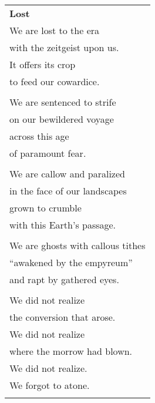 \documentclass{article}
\begin{document}
\begin{center}
\begin{tabular}{l}
\textbf{Lost}
\\
We are lost to the era \\
with the zeitgeist upon us. \\
It offers its crop \\
to feed our cowardice. \\
\\
We are sentenced to strife \\
on our bewildered voyage \\
across this age \\
of paramount fear. \\
\\
We are callow and paralized \\
in the face of our landscapes \\
grown to crumble \\
with this Earth's passage. \\
\\
We are ghosts with callous tithes \\
``awakened by the empyreum'' \\
and rapt by gathered eyes. \\
\\
We did not realize \\
the conversion that arose. \\
We did not realize \\
where the morrow had blown. \\ %
We did not realize. \\
We forgot to atone. \\
\\
\end{tabular}
\end{center}
\end{document}

